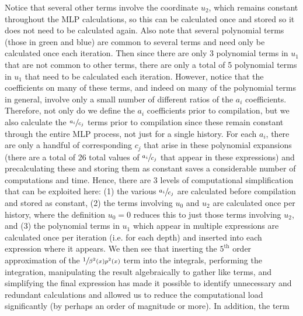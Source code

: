 \documentclass[a4paper,landscape]{article}
\begin{document}
Notice that several other terms involve the coordinate $u_2$, which remains constant throughout the MLP calculations, so this can be calculated once and stored so it does not need to be calculated again. Also note that several polynomial terms (those in green and blue) are common to several terms and need only be calculated once each iteration.  Then since there are only 3 polynomial terms in $u_1$ that are not common to other terms, there are only a total of 5 polynomial terms in $u_1$ that need to be calculated each iteration.  However, notice that the coefficients on many of these terms, and indeed on many of the polynomial terms in general, involve only a small number of different ratios of the $a_i$ coefficients.  Therefore, not only do we define the $a_i$ coefficients prior to compilation, but we also calculate the $\sfrac{a_i}{c_j}$ terms prior to compilation since these remain constant through the entire MLP process, not just for a single history.  For each $a_i$, there are only a handful of corresponding $c_j$ that arise in these polynomial expansions (there are a total of 26 total values of $\sfrac{a_i}{c_j}$ that appear in these expressions) and precalculating these and storing them as constant saves a considerable number of computations and time.  Hence, there are 3 levels of computational simplification that can be exploited here: (1) the various $\sfrac{a_i}{c_j}$ are calculated before compilation and stored as constant, (2) the terms involving $u_0$ and $u_2$ are calculated once per history, where the definition $u_0=0$ reduces this to just those terms involving $u_2$, and (3) the polynomial terms in $u_1$ which appear in multiple expressions are calculated once per iteration (i.e. for each depth) and inserted into each expression where it appears.  We then see that inserting the $5^{\text{th}}$ order approximation of the $\sfrac{1}{\beta^2(x)p^2(x)}$ term into the integrals, performing the integration, manipulating the result algebraically to gather like terms, and simplifying the final expression has made it possible to identify unnecessary and redundant calculations and allowed us to reduce the computational load significantly (by perhaps an order of magnitude or more).
In addition, the term 
\end{document}
